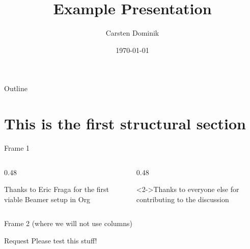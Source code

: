 \documentclass[presentation]{beamer}
\author{Carsten Dominik}
\date{\today}
\title{Example Presentation}
\begin{document}
\maketitle
\begin{frame}{Outline}
\tableofcontents
\end{frame}

\section{This is the first structural section}
\label{sec:org14f9492}

\begin{frame}[label={sec:orgc165cee}]{Frame 1}
\begin{columns}
\begin{column}{0.48\columnwidth}
\begin{block}{Thanks to Eric Fraga}
for the first viable Beamer setup in Org
\end{block}
\end{column}
\begin{column}{0.48\columnwidth}
\begin{block}<2->{Thanks to everyone else}
for contributing to the discussion
\end{block}
\end{column}
\end{columns}
\end{frame}
\begin{frame}[label={sec:orgbc7db53}]{Frame 2 (where we will not use columns)}
\begin{block}{Request}
Please test this stuff!
\end{block}
\end{frame}
\end{document}

